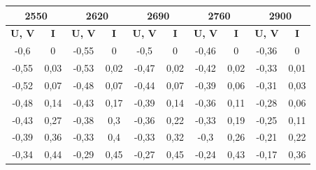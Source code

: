 \documentclass[a4paper, 12pt]{article}
\begin{document}
\begin{table}[H]
	\centering
	\begin{tabular}{|cc|cc|cc|cc|cc|}
	\hline
	\multicolumn{2}{|c|}{\textbf{2550}}              & \multicolumn{2}{c|}{\textbf{2620}}              & \multicolumn{2}{c|}{\textbf{2690}}              & \multicolumn{2}{c|}{\textbf{2760}}              & \multicolumn{2}{c|}{\textbf{2900}}              \\ \hline
	\multicolumn{1}{|c|}{\textbf{U, V}} & \textbf{I} & \multicolumn{1}{c|}{\textbf{U, V}} & \textbf{I} & \multicolumn{1}{c|}{\textbf{U, V}} & \textbf{I} & \multicolumn{1}{c|}{\textbf{U, V}} & \textbf{I} & \multicolumn{1}{c|}{\textbf{U, V}} & \textbf{I} \\ \hline
	\multicolumn{1}{|c|}{-0,6}          & 0          & \multicolumn{1}{c|}{-0,55}         & 0          & \multicolumn{1}{c|}{-0,5}          & 0          & \multicolumn{1}{c|}{-0,46}         & 0          & \multicolumn{1}{c|}{-0,36}         & 0          \\ \hline
	\multicolumn{1}{|c|}{-0,55}         & 0,03       & \multicolumn{1}{c|}{-0,53}         & 0,02       & \multicolumn{1}{c|}{-0,47}         & 0,02       & \multicolumn{1}{c|}{-0,42}         & 0,02       & \multicolumn{1}{c|}{-0,33}         & 0,01       \\ \hline
	\multicolumn{1}{|c|}{-0,52}         & 0,07       & \multicolumn{1}{c|}{-0,48}         & 0,07       & \multicolumn{1}{c|}{-0,44}         & 0,07       & \multicolumn{1}{c|}{-0,39}         & 0,06       & \multicolumn{1}{c|}{-0,31}         & 0,03       \\ \hline
	\multicolumn{1}{|c|}{-0,48}         & 0,14       & \multicolumn{1}{c|}{-0,43}         & 0,17       & \multicolumn{1}{c|}{-0,39}         & 0,14       & \multicolumn{1}{c|}{-0,36}         & 0,11       & \multicolumn{1}{c|}{-0,28}         & 0,06       \\ \hline
	\multicolumn{1}{|c|}{-0,43}         & 0,27       & \multicolumn{1}{c|}{-0,38}         & 0,3        & \multicolumn{1}{c|}{-0,36}         & 0,22       & \multicolumn{1}{c|}{-0,33}         & 0,19       & \multicolumn{1}{c|}{-0,25}         & 0,11       \\ \hline
	\multicolumn{1}{|c|}{-0,39}         & 0,36       & \multicolumn{1}{c|}{-0,33}         & 0,4        & \multicolumn{1}{c|}{-0,33}         & 0,32       & \multicolumn{1}{c|}{-0,3}          & 0,26       & \multicolumn{1}{c|}{-0,21}         & 0,22       \\ \hline
	\multicolumn{1}{|c|}{-0,34}         & 0,44       & \multicolumn{1}{c|}{-0,29}         & 0,45       & \multicolumn{1}{c|}{-0,27}         & 0,45       & \multicolumn{1}{c|}{-0,24}         & 0,43       & \multicolumn{1}{c|}{-0,17}         & 0,36       \\ \hline

\end{tabular}
\end{table}
\end{document}
